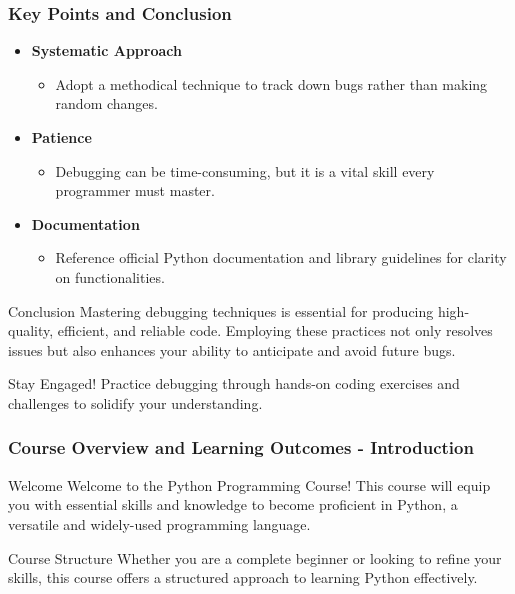 \documentclass{beamer}
\begin{document}
\begin{frame}[fragile]
    \frametitle{Key Points and Conclusion}
    \begin{itemize}
        \item \textbf{Systematic Approach}
        \begin{itemize}
            \item Adopt a methodical technique to track down bugs rather than making random changes.
        \end{itemize}
        \item \textbf{Patience}
        \begin{itemize}
            \item Debugging can be time-consuming, but it is a vital skill every programmer must master.
        \end{itemize}
        \item \textbf{Documentation}
        \begin{itemize}
            \item Reference official Python documentation and library guidelines for clarity on functionalities.
        \end{itemize}
    \end{itemize}

    \begin{block}{Conclusion}
        Mastering debugging techniques is essential for producing high-quality, efficient, and reliable code. 
        Employing these practices not only resolves issues but also enhances your ability to anticipate and avoid future bugs.
    \end{block}
    
    \begin{block}{Stay Engaged!}
        Practice debugging through hands-on coding exercises and challenges to solidify your understanding.
    \end{block}
\end{frame}

\begin{frame}[fragile]
    \frametitle{Course Overview and Learning Outcomes - Introduction}
    \begin{block}{Welcome}
        Welcome to the Python Programming Course! This course will equip you with essential skills and knowledge to become proficient in Python, a versatile and widely-used programming language. 
    \end{block}
    \begin{block}{Course Structure}
        Whether you are a complete beginner or looking to refine your skills, this course offers a structured approach to learning Python effectively.
    \end{block}
\end{frame}
\end{document}
